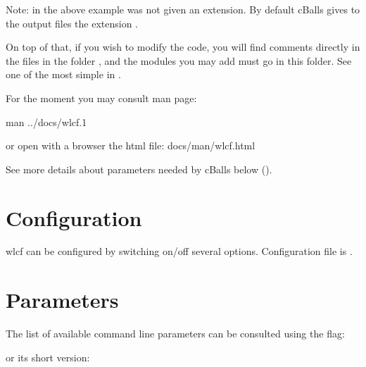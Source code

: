 \documentclass[letterpaper,10pt,english]{sphinxmanual}
\begin{document}
\sphinxAtStartPar
Note: in the above example  was not given an extension. By default cBalls gives to the output files the extension .

\sphinxAtStartPar
On top of that, if you wish to modify the code, you will find comments directly in the files in the folder , and the modules you may add must go in this folder. See one of the most simple in .

\sphinxAtStartPar
For the moment you may consult man page:

\begin{sphinxVerbatim}[commandchars=\\\{\}]
\PYGZdl{} man ../docs/wlcf.1
\end{sphinxVerbatim}

\sphinxAtStartPar
or open with a browser the html file: docs/man/wlcf.html

\sphinxAtStartPar
See more details about parameters needed by cBalls below ({\hyperref[\detokenize{overview:parameters}]{}}).


\section{Configuration}
\label{\detokenize{overview:configuration}}
\sphinxAtStartPar
wlcf can be configured by switching on/off several options. Configuration file is .


\section{Parameters}
\label{\detokenize{overview:parameters}}\label{\detokenize{overview:id1}}
\sphinxAtStartPar
The list of available command line parameters can be consulted using the  flag:

\begin{sphinxVerbatim}[commandchars=\\\{\}]
 
\end{sphinxVerbatim}

\sphinxAtStartPar
or its short version:

\begin{sphinxVerbatim}[commandchars=\\\{\}]
 
\end{sphinxVerbatim}
\end{document}
